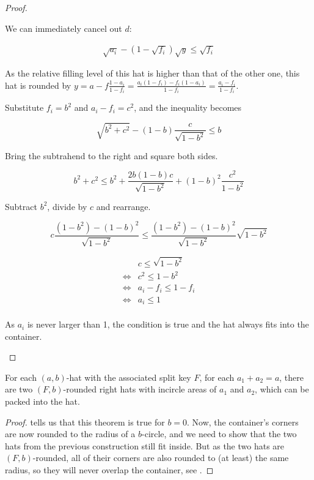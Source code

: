 \documentclass[%
    a4paper,              %
    style=screen,          %
    bibliography=totoc,   %
    nexus,                %
    lnum,                 %
    extramargin,          %
]{tubsbook}
\begin{document}
\begin{proof}
\begin{itemize}
            We can immediately cancel out $d$:

            \begin{align*}
                \sqrt{a_i} - (1-\sqrt{f_i})\sqrt{y} \le \sqrt{f_i}
            \end{align*}

            As the relative filling level of this hat is higher than that of the other one, this hat is rounded by $y = a - f\frac{1-a_i}{1-f_i} = \frac{a_i(1-f_i)-f_i(1-a_i)}{1-f_i} = \frac{a_i-f_i}{1-f_i}$.


            Substitute $f_i = b^2$ and $a_i-f_i = c^2$, and the inequality becomes

            $$\sqrt{b^2+c^2} - (1-b)\frac{c}{\sqrt{1-b^2}} \le b$$

            Bring the subtrahend to the right and square both sides.

            $$b^2+c^2 \le b^2 + \frac{2b(1-b)c}{\sqrt{1-b^2}} + (1-b)^2\frac{c^2}{1-b^2}$$

            Subtract $b^2$, divide by $c$ and rearrange.

            $$c\frac{(1-b^2)-(1-b)^2}{\sqrt{1-b^2}} \le \frac{(1-b^2)-(1-b)^2}{\sqrt{1-b^2}}\sqrt{1-b^2}$$

            \begin{align*}
                &c \le \sqrt{1-b^2}\\
                \iff &c^2 \le 1-b^2\\
                \iff &a_i - f_i \le 1-f_i\\
                \iff &a_i \le 1\\
            \end{align*}

            As $a_i$ is never larger than 1, the condition is true and the hat always fits into the container.
    \end{itemize}
\end{proof}

\begin{lemma}\label{th:roundedhatsinhat}
    For each $(a,b)$-hat with the associated split key $F$,
    for each $a_1 + a_2 = a$, there are two $(F,b)$-rounded right hats with incircle areas of $a_1$ and $a_2$, which can be packed into the hat.
\end{lemma}

\begin{proof}
    \label{th:hatsinhat} tells us that this theorem is true for $b = 0$. Now, the container's corners are now rounded to the radius of a $b$-circle, and we need to show that the two hats from the previous construction still fit inside. But as the two hats are $(F,b)$-rounded, all of their corners are also rounded to (at least) the same radius, so they will never overlap the container, see .
\end{proof}
\end{document}
